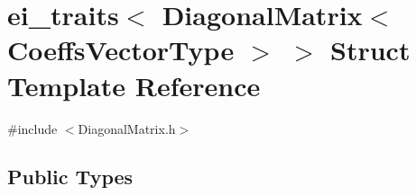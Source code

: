 \hypertarget{structei__traits_3_01_diagonal_matrix_3_01_coeffs_vector_type_01_4_01_4}{\section{ei\-\_\-traits$<$ Diagonal\-Matrix$<$ Coeffs\-Vector\-Type $>$ $>$ Struct Template Reference}
\label{structei__traits_3_01_diagonal_matrix_3_01_coeffs_vector_type_01_4_01_4}
}


{\ttfamily \#include $<$Diagonal\-Matrix.\-h$>$}

\subsection*{Public Types}
